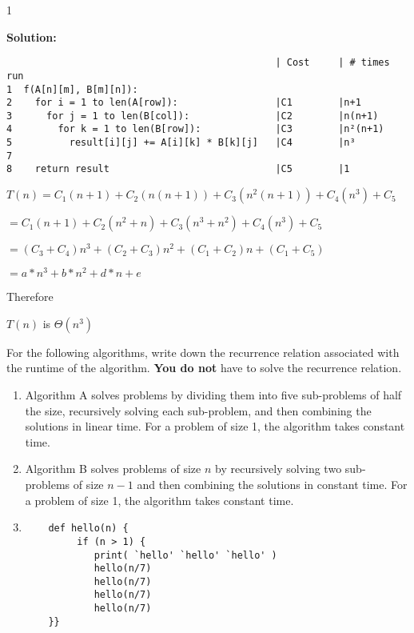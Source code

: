 \documentclass[9pt]{article}
\def\solutions{1}
\begin{document}
\if\solutions1
\vspace{2mm}

\textbf{Solution:} \\
\begin{verbatim}
                                               | Cost     | # times run
1  f(A[n][m], B[m][n]):
2    for i = 1 to len(A[row]):                 |C1        |n+1 
3      for j = 1 to len(B[col]):               |C2        |n(n+1) 
4        for k = 1 to len(B[row]):             |C3        |n²(n+1)
5          result[i][j] += A[i][k] * B[k][j]   |C4        |n³
7
8    return result                             |C5        |1 
\end{verbatim}
$T(n) = C_1(n+1) +C_2(n(n+1)) + C_3(n^{2}(n+1)) + C_4(n^{3}) + C_5$

$ = C_1(n+1) +C_2(n^{2}+n) + C_3(n^{3}+n^{2}) + C_4(n^{3}) + C_5 $

$ = (C_3 + C_4)n^{3} + (C_2 + C_3)n^{2} + (C_1 + C_2)n + (C_1 + C_5)$

$ = a*n^{3} + b*n^{2} + d*n + e$

Therefore 

$T(n)$ is $\Theta(n^{3})$


\fi

\newpage

\vspace{5mm}

\item For the following algorithms, write down the recurrence relation associated with the runtime of the algorithm. \textbf{You do not} have to solve the recurrence relation.

\begin{enumerate}
    \item Algorithm A solves problems by dividing them into five sub-problems of half the size, recursively solving each sub-problem, and then combining the solutions in linear time. For a problem of size 1, the algorithm takes constant time.

    \item Algorithm B solves problems of size $n$ by recursively solving two sub-problems of size $n - 1$ and then combining the solutions in constant time. For a problem of size 1, the algorithm takes constant time.
    
    \item 
    	\begin{verbatim}
	def hello(n) {
	     if (n > 1) {
	        print( `hello' `hello' `hello' )
	        hello(n/7)
	        hello(n/7)
	        hello(n/7)
	        hello(n/7)
	}}
	\end{verbatim}
\end{enumerate}
\end{document}
